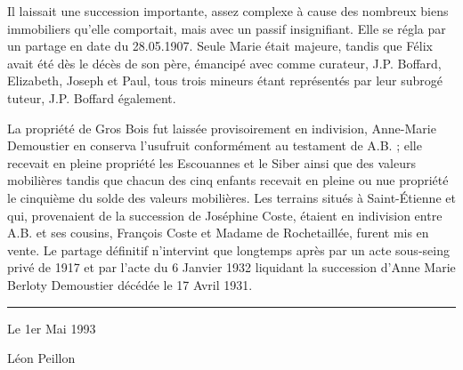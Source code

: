 \documentclass[11pt,a4paper]{report}
\begin{document}
Il laissait une succession importante, assez complexe à cause des nombreux biens immobiliers qu'elle comportait, mais avec un passif insignifiant. Elle se régla par un partage en date du 28.05.1907. Seule Marie était majeure, tandis que Félix avait été dès le décès de son père, émancipé avec comme curateur, J.P. Boffard, Elizabeth, Joseph et Paul, tous trois mineurs étant représentés par leur subrogé tuteur, J.P. Boffard également.


La propriété de Gros Bois fut laissée provisoirement en indivision, Anne-Marie Demoustier en conserva l'usufruit conformément au testament de A.B. ; elle recevait en pleine propriété les Escouannes et le Siber ainsi que des valeurs mobilières tandis que chacun des cinq enfants recevait en pleine ou nue propriété le cinquième du solde des valeurs mobilières. Les terrains situés à Saint-Étienne et qui, provenaient de la succession de Joséphine Coste, étaient en indivision entre A.B. et ses cousins, François Coste et Madame de Rochetaillée, furent mis en vente. Le partage définitif n'intervint que longtemps après par un acte sous-seing privé de 1917 et par l'acte du 6 Janvier 1932 liquidant la succession d'Anne Marie Berloty Demoustier décédée le 17 Avril 1931.

\begin{center}\rule{0.5\linewidth}{0.5pt}\end{center}

Le 1er Mai 1993

Léon Peillon
\end{document}
